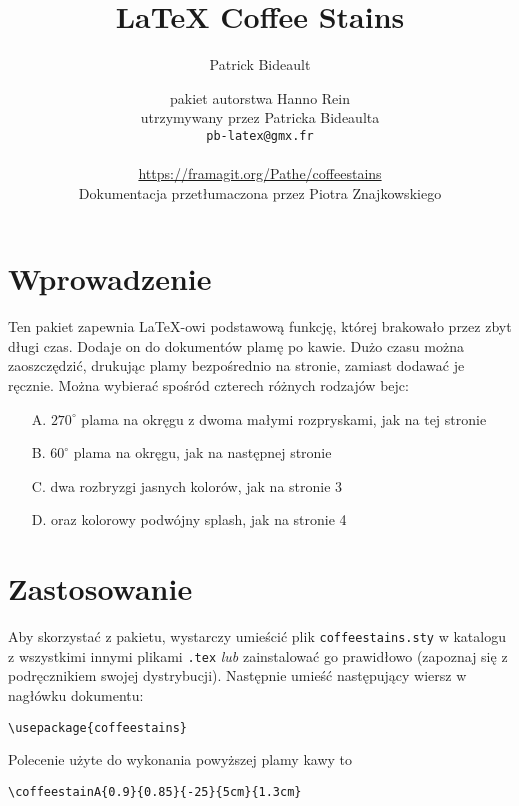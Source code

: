 \documentclass[a4paper, 11pt, BCOR = 0 pt, DIV = 11, oneside]{scrartcl}
\author{Patrick Bideault}
\begin{document}
\title{LaTeX Coffee Stains}
\author{pakiet autorstwa Hanno Rein\\
utrzymywany przez Patricka Bideaulta\\
  \texttt{pb-latex@gmx.fr}\\
  ~\\
  \url{https://framagit.org/Pathe/coffeestains}\\[1 mm]
Dokumentacja przetłumaczona przez Piotra Znajkowskiego}
\renewcommand{\today}{version \gitRel{} -- \DTMtoday{}}
\maketitle

\label{stainA}
\section{Wprowadzenie}
Ten pakiet zapewnia \LaTeX{}-owi podstawową funkcję, której brakowało przez zbyt
długi czas. Dodaje on do dokumentów plamę po kawie. Dużo czasu można
zaoszczędzić, drukując plamy bezpośrednio na stronie, zamiast dodawać je
ręcznie. Można wybierać spośród czterech różnych rodzajów bejc:
\begin{itemize}
\item[A.] $270^\circ$ plama na okręgu z dwoma małymi rozpryskami, jak na tej stronie 
  \item[B.] $60^\circ$ plama na okręgu, jak na następnej stronie 
  \item[C.] dwa rozbryzgi jasnych kolorów, jak na stronie 3 
  \item[D.] oraz kolorowy podwójny splash, jak na stronie 4 
\end{itemize}

\section{Zastosowanie}
Aby skorzystać z pakietu, wystarczy umieścić plik \texttt{coffeestains.sty} w katalogu z wszystkimi innymi plikami \texttt{.tex} \emph{lub} zainstalować go prawidłowo (zapoznaj się z podręcznikiem swojej dystrybucji).
Następnie umieść następujący wiersz w nagłówku dokumentu:
\begin{verbatim}
\usepackage{coffeestains}
\end{verbatim}

\vfill{}

\begin{tcolorbox}
  Polecenie użyte do wykonania powyższej plamy kawy to

  \verb|\coffeestainA{0.9}{0.85}{-25}{5cm}{1.3cm}|
\end{tcolorbox}
\newpage{}
\label{stainB}
\end{document}

